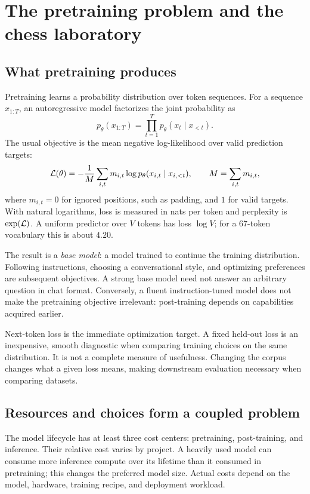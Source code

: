 \chapter{The pretraining problem and the chess laboratory}
\section{What pretraining produces}
Pretraining learns a probability distribution over token sequences. For a sequence $x_{1:T}$, an autoregressive model factorizes the joint probability as
\begin{equation}
 p_\theta(x_{1:T})=\prod_{t=1}^{T}p_\theta(x_t\mid x_{<t}).
\end{equation}
The usual objective is the mean negative log-likelihood over valid prediction targets:
\begin{equation}\label{eq:nll}
 \mathcal L(\theta)=-\frac{1}{M}\sum_{i,t}m_{i,t}\log p_\theta(x_{i,t}\mid x_{i,<t}),
 \qquad M=\sum_{i,t}m_{i,t},
\end{equation}
where $m_{i,t}=0$ for ignored positions, such as padding, and $1$ for valid targets. With natural logarithms, loss is measured in nats per token and perplexity is $\exp(\mathcal L)$. A uniform predictor over $V$ tokens has loss $\log V$; for a 67-token vocabulary this is about $4.20$.

The result is a \emph{base model}: a model trained to continue the training distribution. Following instructions, choosing a conversational style, and optimizing preferences are subsequent objectives. A strong base model need not answer an arbitrary question in chat format. Conversely, a fluent instruction-tuned model does not make the pretraining objective irrelevant: post-training depends on capabilities acquired earlier.

Next-token loss is the immediate optimization target. A fixed held-out loss is an inexpensive, smooth diagnostic when comparing training choices on the same distribution. It is not a complete measure of usefulness. Changing the corpus changes what a given loss means, making downstream evaluation necessary when comparing datasets.

\section{Resources and choices form a coupled problem}
The model lifecycle has at least three cost centers: pretraining, post-training, and inference. Their relative cost varies by project. A heavily used model can consume more inference compute over its lifetime than it consumed in pretraining; this changes the preferred model size. Actual costs depend on the model, hardware, training recipe, and deployment workload.

